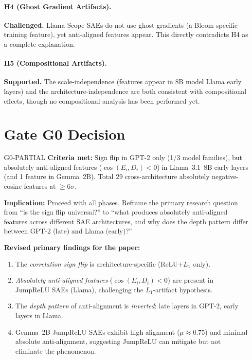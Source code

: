 \documentclass[11pt,a4paper]{article}
\newcommand{\cosED}{\cos(E_i, D_i)}
\begin{document}
\paragraph{H4 (Ghost Gradient Artifacts).} \textbf{Challenged.} Llama Scope SAEs do not use ghost gradients (a Bloom-specific training feature), yet anti-aligned features appear. This directly contradicts H4 as a complete explanation.

\paragraph{H5 (Compositional Artifacts).} \textbf{Supported.} The scale-independence (features appear in 8B model Llama early layers) and the architecture-independence are both consistent with compositional effects, though no compositional analysis has been performed yet.

\section{Gate G0 Decision}
\label{sec:gate}

\begin{gatedecision}{G0-PARTIAL}
\textbf{Criteria met:} Sign flip in GPT-2 only (1/3 model families), but absolutely anti-aligned features ($\cosED < 0$) in Llama~3.1~8B early layers (and 1 feature in Gemma~2B). Total 29 cross-architecture absolutely negative-cosine features at $\geq 6\sigma$.

\textbf{Implication:} Proceed with all phases. Reframe the primary research question from ``is the sign flip universal?'' to ``what produces absolutely anti-aligned features across different SAE architectures, and why does the depth pattern differ between GPT-2 (late) and Llama (early)?''

\textbf{Revised primary findings for the paper:}
\begin{enumerate}[nosep]
  \item The \emph{correlation sign flip} is architecture-specific (ReLU$+L_1$ only).
  \item \emph{Absolutely anti-aligned features} ($\cosED < 0$) are present in JumpReLU SAEs (Llama), challenging the $L_1$-artifact hypothesis.
  \item The \emph{depth pattern} of anti-alignment is \emph{inverted}: late layers in GPT-2, early layers in Llama.
  \item Gemma~2B JumpReLU SAEs exhibit high alignment ($\mu \approx 0.75$) and minimal absolute anti-alignment, suggesting JumpReLU can mitigate but not eliminate the phenomenon.
\end{enumerate}
\end{gatedecision}
\end{document}
